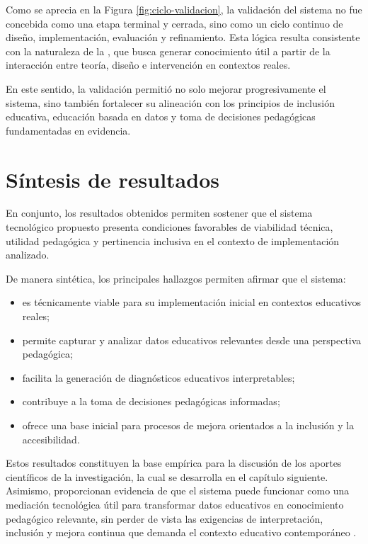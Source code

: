 \begin{refsection}
Como se aprecia en la Figura \ref{fig:ciclo-validacion}, la validación del sistema no fue concebida como una etapa terminal y cerrada, sino como un ciclo continuo de diseño, implementación, evaluación y refinamiento. Esta lógica resulta consistente con la naturaleza de la \DBR, que busca generar conocimiento útil a partir de la interacción entre teoría, diseño e intervención en contextos reales.

En este sentido, la validación permitió no solo mejorar progresivamente el sistema, sino también fortalecer su alineación con los principios de inclusión educativa, educación basada en datos y toma de decisiones pedagógicas fundamentadas en evidencia.

\section{Síntesis de resultados}

En conjunto, los resultados obtenidos permiten sostener que el sistema tecnológico propuesto presenta condiciones favorables de viabilidad técnica, utilidad pedagógica y pertinencia inclusiva en el contexto de implementación analizado.

De manera sintética, los principales hallazgos permiten afirmar que el sistema:

\begin{itemize}
\item es técnicamente viable para su implementación inicial en contextos educativos reales;
\item permite capturar y analizar datos educativos relevantes desde una perspectiva pedagógica;
\item facilita la generación de diagnósticos educativos interpretables;
\item contribuye a la toma de decisiones pedagógicas informadas;
\item ofrece una base inicial para procesos de mejora orientados a la inclusión y la accesibilidad.
\end{itemize}

Estos resultados constituyen la base empírica para la discusión de los aportes científicos de la investigación, la cual se desarrolla en el capítulo siguiente. Asimismo, proporcionan evidencia de que el sistema puede funcionar como una mediación tecnológica útil para transformar datos educativos en conocimiento pedagógico relevante, sin perder de vista las exigencias de interpretación, inclusión y mejora continua que demanda el contexto educativo contemporáneo \parencite{siemenslong2011,unesco2021,rossi2018}.

\printbibliography[heading=subbibliography,title={Referencias (Capítulo V)}]

\end{refsection}